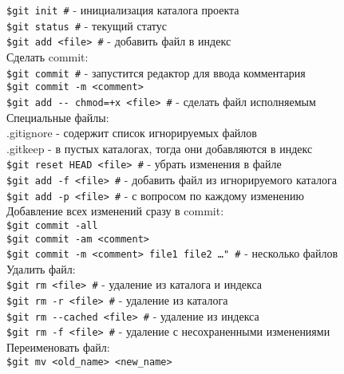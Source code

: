 \documentclass[12pt, a4paper]{article}
\begin{document}
\texttt{\$git init \indent \#} - инициализация каталога проекта \\
\texttt{\$git status \indent \#} - текущий статус \\
\texttt{\$git add <file> \indent \#} - добавить файл в индекс \\
Сделать commit:\\
\indent\texttt{\$git commit \indent \#} - запустится редактор для ввода комментария \\
\indent\texttt{\$git commit -m <comment>} \\
\texttt{\$git add {-}- chmod=+x <file> \indent \#} - сделать файл исполняемым \\
	
\noindent Специальные файлы:\\
\indent.gitignore \indent - содержит список игнорируемых файлов \\
\indent.gitkeep \indent - в пустых каталогах, тогда они добавляются в индекс\\

\noindent\texttt{\$git reset HEAD <file> \indent \#} - убрать изменения в файле \\
\texttt{\$git  add -f <file> \indent \#} - добавить файл из игнорируемого каталога\\
	

\texttt{\$git add -p <file> \indent \#} - с вопросом по каждому изменению \\

\noindent Добавление всех изменений сразу в commit:\\
\indent \texttt{\$git commit -all \indent} \\
\indent \texttt{\$git commit -am <comment>} \\
\indent \texttt{\$git commit -m <comment> file1 file2 \ldots" \#} - несколько файлов \\

\noindent Удалить файл: \\
\indent \texttt{\$git rm <file> \indent \#} - удаление из каталога и индекса \\
\indent \texttt{\$git rm -r <file> \indent \#} - удаление из каталога\\
\indent \texttt{\$git rm {-}-cached <file> \indent \#} - удаление из индекса \\
\indent \texttt{\$git rm -f <file> \indent \#} - удаление с несохраненными изменениями\\

\noindent Переименовать файл:\\
\indent \texttt{\$git mv <old\_name> <new\_name>}
\end{document}
